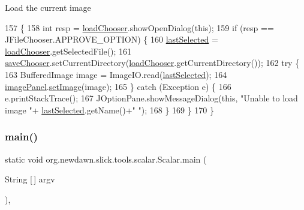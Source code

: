 Load the current image 
\begin{DoxyCode}
157                        \{
158         \textcolor{keywordtype}{int} resp = \mbox{\hyperlink{classorg_1_1newdawn_1_1slick_1_1tools_1_1scalar_1_1_scalar_a36ca61e15f5624af75dfa66a9212e97e}{loadChooser}}.showOpenDialog(\textcolor{keyword}{this});
159         \textcolor{keywordflow}{if} (resp == JFileChooser.APPROVE\_OPTION) \{
160             \mbox{\hyperlink{classorg_1_1newdawn_1_1slick_1_1tools_1_1scalar_1_1_scalar_a4259f6e51797ec01cafec826854c94a4}{lastSelected}} = \mbox{\hyperlink{classorg_1_1newdawn_1_1slick_1_1tools_1_1scalar_1_1_scalar_a36ca61e15f5624af75dfa66a9212e97e}{loadChooser}}.getSelectedFile();
161             \mbox{\hyperlink{classorg_1_1newdawn_1_1slick_1_1tools_1_1scalar_1_1_scalar_aaba5299d75aaf1c811ea0a7395ef2afb}{saveChooser}}.setCurrentDirectory(\mbox{\hyperlink{classorg_1_1newdawn_1_1slick_1_1tools_1_1scalar_1_1_scalar_a36ca61e15f5624af75dfa66a9212e97e}{loadChooser}}.getCurrentDirectory());
162             \textcolor{keywordflow}{try} \{
163                 BufferedImage image = ImageIO.read(\mbox{\hyperlink{classorg_1_1newdawn_1_1slick_1_1tools_1_1scalar_1_1_scalar_a4259f6e51797ec01cafec826854c94a4}{lastSelected}});
164                 \mbox{\hyperlink{classorg_1_1newdawn_1_1slick_1_1tools_1_1scalar_1_1_scalar_a660c23cbae7b52f06768db8e8841bc39}{imagePanel}}.\mbox{\hyperlink{classorg_1_1newdawn_1_1slick_1_1tools_1_1scalar_1_1_image_panel_a16339485944d8c28fc4c198f5fc21705}{setImage}}(image);
165             \} \textcolor{keywordflow}{catch} (Exception e) \{
166                 e.printStackTrace();
167                 JOptionPane.showMessageDialog(\textcolor{keyword}{this}, \textcolor{stringliteral}{"Unable to load image "}+
      \mbox{\hyperlink{classorg_1_1newdawn_1_1slick_1_1tools_1_1scalar_1_1_scalar_a4259f6e51797ec01cafec826854c94a4}{lastSelected}}.getName()+\textcolor{stringliteral}{" "});
168             \}
169         \}
170     \}
\end{DoxyCode}
\mbox{\label{classorg_1_1newdawn_1_1slick_1_1tools_1_1scalar_1_1_scalar_a291af21bfb69996922012f2967009677}} 
\subsubsection{\texorpdfstring{main()}{main()}}
{\footnotesize\ttfamily static void org.\+newdawn.\+slick.\+tools.\+scalar.\+Scalar.\+main (\begin{DoxyParamCaption}\item[{String \mbox{[}$\,$\mbox{]}}]{argv }\end{DoxyParamCaption})\hspace{0.3cm}{\ttfamily [inline]}, {\ttfamily [static]}}

